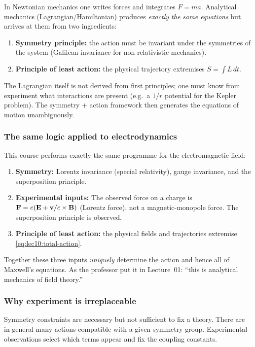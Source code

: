 In Newtonian mechanics one writes forces and integrates $F=ma$.  Analytical mechanics
(Lagrangian/Hamiltonian) produces \emph{exactly the same equations} but arrives at them from two
ingredients:
\begin{enumerate}
  \item \textbf{Symmetry principle:} the action must be invariant under the symmetries of the system
        (Galilean invariance for non-relativistic mechanics).
  \item \textbf{Principle of least action:} the physical trajectory extremises $S=\int L\,dt$.
\end{enumerate}
The Lagrangian itself is not derived from first principles; one must know from experiment what
interactions are present (e.g.\ a $1/r$ potential for the Kepler problem).  The symmetry + action
framework then generates the equations of motion unambiguously.

\subsubsection*{The same logic applied to electrodynamics}

This course performs exactly the same programme for the electromagnetic field:
\begin{enumerate}
  \item \textbf{Symmetry:} Lorentz invariance (special relativity), gauge invariance, and the
        superposition principle.
  \item \textbf{Experimental inputs:} The observed force on a charge is $\mathbf{F}=e(\mathbf{E}+\mathbf{v}/c\times\mathbf{B})$
        (Lorentz force), not a magnetic-monopole force.  The superposition principle is observed.
  \item \textbf{Principle of least action:} the physical fields and trajectories extremise
        \eqref{eq:lec10:total-action}.
\end{enumerate}
Together these three inputs \emph{uniquely} determine the action and hence all of Maxwell's
equations.  As the professor put it in Lecture~01: ``this is analytical mechanics of field theory.''

\subsubsection*{Why experiment is irreplaceable}

Symmetry constraints are necessary but not sufficient to fix a theory.  There are in general many
actions compatible with a given symmetry group.  Experimental observations select which terms appear
and fix the coupling constants.

